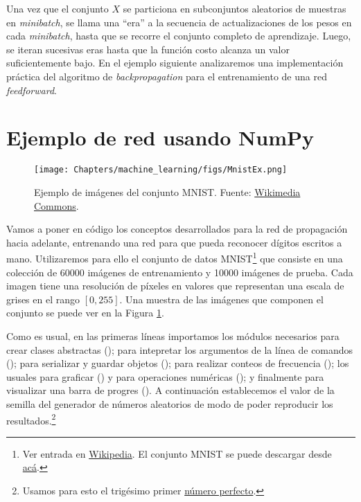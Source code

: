 Una vez que el conjunto $X$ se particiona en subconjuntos aleatorios de muestras en \textit{minibatch}, se llama una ``era'' a la secuencia de actualizaciones de los pesos en cada \textit{minibatch}, hasta que se recorre el conjunto completo de aprendizaje. Luego, se iteran sucesivas eras hasta que la función costo alcanza un valor suficientemente bajo. En el ejemplo siguiente analizaremos una implementación práctica del algoritmo de \textit{backpropagation} para el entrenamiento de una red \textit{feedforward}. 


\section{Ejemplo de red usando NumPy}

\begin{figure}
    \begin{center}
    \texttt{[image: Chapters/machine\_learning/figs/MnistEx.png]}
\end{center}
    \caption{Ejemplo de imágenes del conjunto MNIST. Fuente: \href{https://commons.wikimedia.org/w/index.php?curid=132282871}{Wikimedia Commons}.}
    \label{fig:mnist}
\end{figure}

Vamos a poner en código los conceptos desarrollados para la red de propagación hacia adelante, entrenando una red para que pueda reconocer dígitos escritos a mano. Utilizaremos para ello el conjunto de datos MNIST\footnote{Ver entrada en \href{https://es.wikipedia.org/wiki/Base\_de\_datos\_MNIST}{Wikipedia}. El conjunto MNIST se puede descargar desde \href{https://www.kaggle.com/datasets/oddrationale/mnist-in-csv}{acá}.} que consiste en una colección de \num{60000} imágenes de entrenamiento y \num{10000} imágenes de prueba. Cada imagen tiene una resolución de  píxeles en valores que representan una escala de grises en el rango $[0, 255]$. Una muestra de las imágenes que componen el conjunto se puede ver en la Figura \ref{fig:mnist}. 

Como es usual, en las primeras líneas importamos los módulos necesarios para crear clases abstractas (); para intepretar los argumentos de la línea de comandos (); para serializar y guardar objetos (); para realizar conteos de frecuencia (); los usuales para graficar () y para operaciones numéricas (); y finalmente para visualizar una barra de progres (). A continuación establecemos el valor de la semilla del generador de números aleatorios de modo de poder reproducir los resultados.\footnote{Usamos para esto el trigésimo primer \href{https://es.wikipedia.org/wiki/Número\_perfecto}{número perfecto}.}

